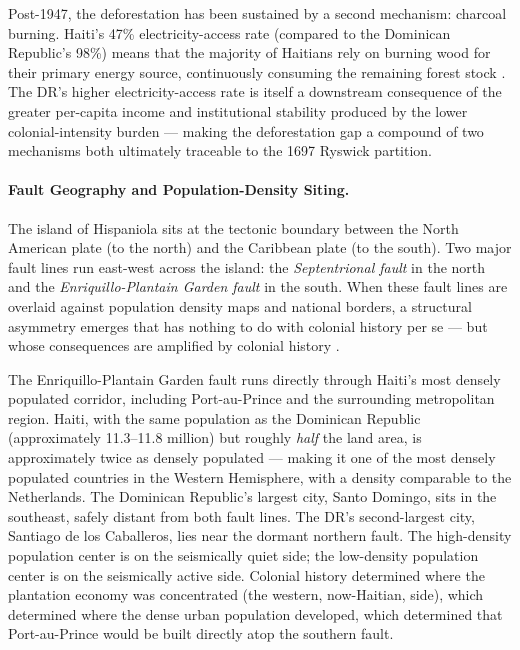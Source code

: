 Post-1947, the deforestation has been sustained by a second mechanism: charcoal burning. Haiti's 47\% electricity-access rate (compared to the Dominican Republic's 98\%) means that the majority of Haitians rely on burning wood for their primary energy source, continuously consuming the remaining forest stock \cite{world_bank_wdi_2023}. The DR's higher electricity-access rate is itself a downstream consequence of the greater per-capita income and institutional stability produced by the lower colonial-intensity burden --- making the deforestation gap a compound of two mechanisms both ultimately traceable to the 1697 Ryswick partition.

\paragraph{Fault Geography and Population-Density Siting.}
\label{par:fault_geography}
The island of Hispaniola sits at the tectonic boundary between the North American plate (to the north) and the Caribbean plate (to the south). Two major fault lines run east-west across the island: the \textit{Septentrional fault} in the north and the \textit{Enriquillo-Plantain Garden fault} in the south. When these fault lines are overlaid against population density maps and national borders, a structural asymmetry emerges that has nothing to do with colonial history per se --- but whose consequences are amplified by colonial history \cite{usgs_enriquillo_fault}.

The Enriquillo-Plantain Garden fault runs directly through Haiti's most densely populated corridor, including Port-au-Prince and the surrounding metropolitan region. Haiti, with the same population as the Dominican Republic (approximately 11.3--11.8 million) but roughly \textit{half} the land area, is approximately twice as densely populated --- making it one of the most densely populated countries in the Western Hemisphere, with a density comparable to the Netherlands. The Dominican Republic's largest city, Santo Domingo, sits in the southeast, safely distant from both fault lines. The DR's second-largest city, Santiago de los Caballeros, lies near the dormant northern fault. The high-density population center is on the seismically quiet side; the low-density population center is on the seismically active side. Colonial history determined where the plantation economy was concentrated (the western, now-Haitian, side), which determined where the dense urban population developed, which determined that Port-au-Prince would be built directly atop the southern fault.

